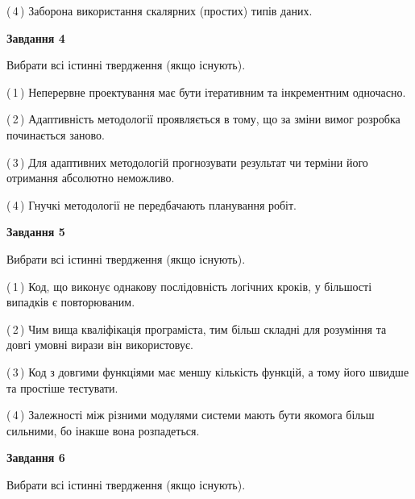 \documentclass[10pt, ukrainian]{article}
\begin{document}
{\begin {large}
(\,4\,) Заборона використання скалярних (простих) типів даних. %


{\begin {center}\textbf{Завдання 4}\end {center}}\par
Вибрати всі істинні твердження (якщо існують).\par
\vspace{2mm}



(\,1\,) Неперервне проектування має бути ітеративним та інкрементним одночасно. %



(\,2\,) Адаптивність методології проявляється в тому, що за зміни вимог розробка починається заново. %



(\,3\,) Для адаптивних методологій прогнозувати результат чи терміни його отримання абсолютно неможливо. %



(\,4\,) Гнучкі методології не передбачають планування робіт. %


{\begin {center}\textbf{Завдання 5}\end {center}}\par
Вибрати всі істинні твердження (якщо існують).\par
\vspace{2mm}



(\,1\,) Код, що виконує однакову послідовність логічних кроків, у більшості випадків є повторюваним.%



(\,2\,) Чим вища кваліфікація програміста, тим більш складні для розуміння та довгі умовні вирази він використовує. %



(\,3\,) Код з довгими функціями має меншу кількість функцій, а тому його швидше та простіше тестувати. %



(\,4\,) Залежності між різними модулями системи мають бути якомога більш сильними, бо інакше вона розпадеться. %

\newpage

{\begin {center}\textbf{Завдання 6}\end {center}}\par
Вибрати всі істинні твердження (якщо існують).\par
\vspace{2mm}




\end{large}}
\end{document}
